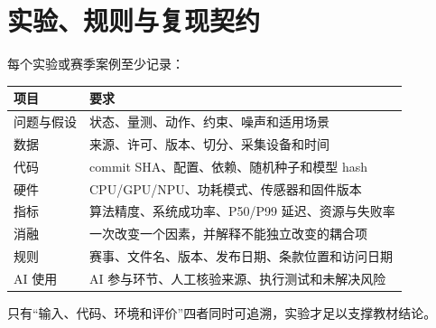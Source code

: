 \chapter{实验、规则与复现契约}
\label{app:experiment-contract}

每个实验或赛季案例至少记录：

\begin{longtable}{p{}p{}}
\toprule
项目 & 要求 \\
\midrule
问题与假设 & 状态、量测、动作、约束、噪声和适用场景 \\
数据 & 来源、许可、版本、切分、采集设备和时间 \\
代码 & commit SHA、配置、依赖、随机种子和模型 hash \\
硬件 & CPU/GPU/NPU、功耗模式、传感器和固件版本 \\
指标 & 算法精度、系统成功率、P50/P99 延迟、资源与失败率 \\
消融 & 一次改变一个因素，并解释不能独立改变的耦合项 \\
规则 & 赛事、文件名、版本、发布日期、条款位置和访问日期 \\
AI 使用 & AI 参与环节、人工核验来源、执行测试和未解决风险 \\
\bottomrule
\end{longtable}

只有“输入、代码、环境和评价”四者同时可追溯，实验才足以支撑教材结论。

